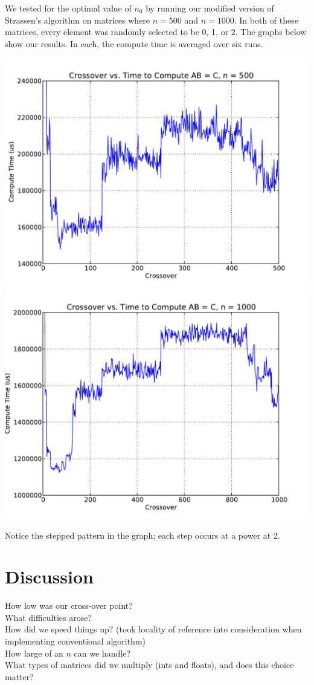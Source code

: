 \documentclass[solution, letterpaper]{cs121}
\begin{document}
We tested for the optimal value of $n_0$ by running our modified version of Strassen's algorithm on matrices where $n=500$ and $n=1000$. In both of these matrices, every element was randomly selected to be 0, 1, or 2. The graphs below show our results. In each, the compute time is averaged over six runs.

\begin{center}
\includegraphics[scale=0.8]{crossover-v-compute-time-500.pdf}
\includegraphics[scale=0.8]{crossover-v-compute-time-1000.pdf}
\end{center}

Notice the stepped pattern in the graph; each step occurs at a power at 2.

\section*{Discussion}

How low was our cross-over point? \\
What difficulties arose? \\
How did we speed things up? (took locality of reference into consideration when implementing conventional algorithm) \\
How large of an $n$ can we handle? \\
What types of matrices did we multiply (ints and floats), and does this choice matter? \\
\end{document}
